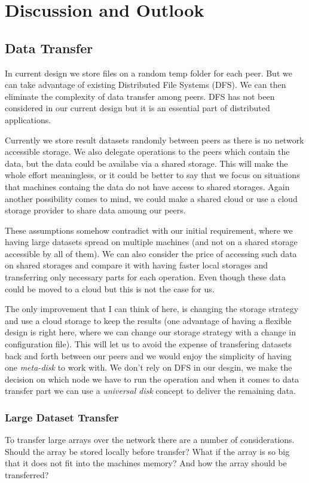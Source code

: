 \chapter{Discussion and Outlook}
\label{cha:discussions}

\section{Data Transfer}
In current design we store files on a random temp folder for each peer.
But we can take advantage of existing Distributed File Systems (DFS).
We can then eliminate the complexity of data transfer among peers. 
DFS has not been considered in our current design but it is an essential part of 
distributed applications.

Currently we store result datasets randomly between peers as there is no
network accessible storage.
We also delegate operations to the peers which contain the data, 
but the data could be availabe via a shared storage.
This will make the whole effort meaningless, 
or it could be better to say that we focus on situations that
machines containg the data do not have access to shared storages.
Again another possibility comes to mind, 
we could make a shared cloud or use a cloud storage provider to 
share data amoung our peers.

These assumptions somehow contradict with our initial requirement,
where we having large datasets spread on multiple machines (and not on a shared storage accessible by all of them). 
We can also consider the price of accessing such data on shared storages and
compare it with having faster local storages and transferring only necessary parts for each operation.
Even though these data could be moved to a cloud but this is not the case for us.

The only improvement that I can think of here, 
is changing the storage strategy and use a cloud storage to keep the results
(one advantage of having a flexible design is right here, 
where we can change our storage strategy with a change in configuration file).
This will let us to avoid the expense of transfering datasets back and forth
between our peers and we would enjoy the simplicity of having one \textit{meta-disk}
to work with. 
We don't rely on DFS in our desgin, we make the decision 
on which node we have to run the operation and when it comes to 
data transfer part we can use a \textit{universal disk} concept to deliver the
remaining data.

\subsection{Large Dataset Transfer}
To transfer large arrays over the network there are a number of considerations. 
Should the array be stored locally before transfer?
What if the array is so big that it does not fit into the machines memory? 
And how the array should be transferred?

